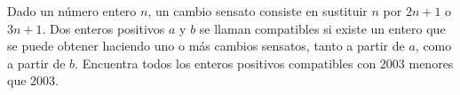 Dado un número entero $n$, un cambio sensato consiste en sustituir $n$ por $2n+1$ o $3n+1$. Dos enteros positivos $a$ y $b$ se llaman compatibles si existe un entero que se puede obtener haciendo uno o más cambios sensatos, tanto a partir de $a$, como a partir de $b$. Encuentra todos los enteros positivos compatibles con $2003$ menores que $2003$.